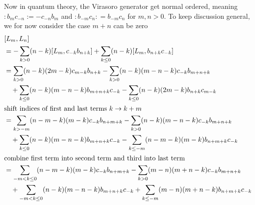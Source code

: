 \begin{enumerate}[label=(\alph*)]
		Now in quantum theory, the Virasoro generator get normal ordered, meaning $:b_m c_{-n}:=-c_{-n}b_m$ and $:b_{-m}c_n : = b_{-m}c_n$ for $m,n>0$. To keep discussion general, we for now consider the case $m+n$ can be zero
		\begin{align}
			 &\comm{L_m}{L_n} \notag \\
			 &= -\sum_{k>0} (n-k) \comm{L_m}{c_{-k}b_{n+k}} + \sum_{k\leq 0} (n-k) \comm{L_m}{b_{n+k}c_{-k}} \notag \\
								 &= \sum_{k>0} (n-k)(2m-k) c_{m-k} b_{n+k} - \sum_{k>0} (n-k) (m-n-k) c_{-k} b_{m+n+k} \notag \\
								 &\quad + \sum_{k\leq 0} (n-k) (m-n-k) b_{m+n+k} c_{-k} - \sum_{k\leq 0} (n-k)(2m-k) b_{n+k} c_{m-k} \notag \\
								 \shortintertext{shift indices of first and last terms $k\rightarrow k+m$}
								 &= \sum_{k>-m} (n-m-k)(m-k) c_{-k} b_{n+m+k} - \sum_{k>0} (n-k) (m-n-k) c_{-k} b_{m+n+k} \notag \\
								 &\quad + \sum_{k\leq 0} (n-k) (m-n-k) b_{m+n+k} c_{-k} - \sum_{k\leq -m} (n-m-k)(m-k) b_{n+m+k} c_{-k} \notag \\
								 \shortintertext{combine first term into second term and third into last term}
								 &= \sum_{-m<k\leq 0} (n-m-k)(m-k) c_{-k} b_{n+m+k} - \sum_{k>0} (m-n)(m+n-k) c_{-k} b_{m+n+k} \notag \\
								 &\quad + \sum_{-m < k\leq 0} (n-k)(m-n-k) b_{m+n+k} c_{-k} + \sum_{k \leq -m}(m-n)(m+n-k)  b_{n+m+k} c_{-k} \label{math:LL}
		\end{align}		
	

\end{enumerate}
